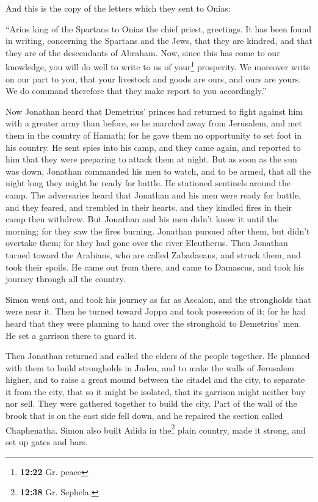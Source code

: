  And this is the copy of the letters which they sent to
Onias:

 ``Arius king of the Spartans to Onias the chief priest,
greetings.  It has been found in writing, concerning the
Spartans and the Jews, that they are kindred, and that they are of the
descendants of Abraham.  Now, since this has come to our
knowledge, you will do well to write to us of your\footnote{\textbf{12:22}
  Gr. peace} prosperity.  We moreover write on our part
to you, that your livestock and goods are ours, and ours are yours. We
do command therefore that they make report to you accordingly.''

 Now Jonathan heard that Demetrius' princes had returned
to fight against him with a greater army than before,  so
he marched away from Jerusalem, and met them in the country of Hamath;
for he gave them no opportunity to set foot in his country.
 He sent spies into his camp, and they came again, and
reported to him that they were preparing to attack them at night.
 But as soon as the sun was down, Jonathan commanded his
men to watch, and to be armed, that all the night long they might be
ready for battle. He stationed sentinels around the camp.
 The adversaries heard that Jonathan and his men were
ready for battle, and they feared, and trembled in their hearts, and
they kindled fires in their camp then withdrew.  But
Jonathan and his men didn't know it until the morning; for they saw the
fires burning.  Jonathan pursued after them, but didn't
overtake them; for they had gone over the river Eleutherus.
 Then Jonathan turned toward the Arabians, who are called
Zabadaeans, and struck them, and took their spoils.  He
came out from there, and came to Damascus, and took his journey through
all the country.

 Simon went out, and took his journey as far as Ascalon,
and the strongholds that were near it. Then he turned toward Joppa and
took possession of it;  for he had heard that they were
planning to hand over the stronghold to Demetrius' men. He set a
garrison there to guard it.

 Then Jonathan returned and called the elders of the
people together. He planned with them to build strongholds in Judea,
 and to make the walls of Jerusalem higher, and to raise
a great mound between the citadel and the city, to separate it from the
city, that so it might be isolated, that its garrison might neither buy
nor sell.  They were gathered together to build the city.
Part of the wall of the brook that is on the east side fell down, and he
repaired the section called Chaphenatha.  Simon also
built Adida in the\footnote{\textbf{12:38} Gr. Sephela.} plain country,
made it strong, and set up gates and bars.

